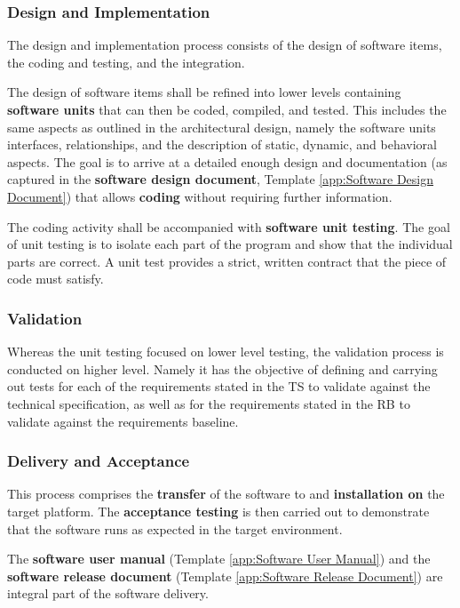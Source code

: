\subsubsection{Design and Implementation}

The design and implementation process consists of the design of software items, the coding and testing, and the integration.

The design of software items shall be refined into lower levels containing \textbf{software units} that can then be coded, compiled, and tested. This includes the same aspects as outlined in the architectural design, namely the software units interfaces, relationships, and the description of static, dynamic, and behavioral aspects. The goal is to arrive at a detailed enough design and documentation (as captured in the \textbf{software design document}, Template \ref{app:Software Design Document}) that allows \textbf{coding} without requiring further information.

The coding activity shall be accompanied with \textbf{software unit testing}. The goal of unit testing is to isolate each part of the program and show that the individual parts are correct. A unit test provides a strict, written contract that the piece of code must satisfy.

\subsubsection{Validation}

Whereas the unit testing focused on lower level testing, the validation process is conducted on higher level. Namely it has the objective of defining and carrying out tests for each of the requirements stated in the TS to validate against the technical specification, as well as for the requirements stated in the RB to validate against the requirements baseline.

\subsubsection{Delivery and Acceptance}

This process comprises the \textbf{transfer} of the software to and \textbf{installation on} the target platform. The \textbf{acceptance testing} is then carried out to demonstrate that the software runs as expected in the target environment.

The \textbf{software user manual} (Template \ref{app:Software User Manual}) and the \textbf{software release document} (Template \ref{app:Software Release Document}) are integral part of the software delivery.

